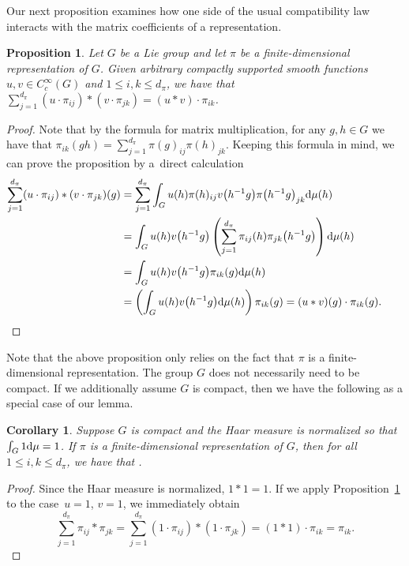 \documentclass[pdftex]{sigma}
\numberwithin{equation}{section}
\newtheorem{Corollary}[Theorem]{Corollary}
\newtheorem{Proposition}[Theorem]{Proposition}
\theoremstyle{definition}
\newcommand{\inv}{^{-1}}
\begin{document}
Our next proposition examines how one side of the usual compatibility law interacts with the matrix coefficients of a representation.
 \begin{Proposition}\label{proposition:convolution.of.non.irreducible.coefficients}
  Let $ G $ be a Lie group and let $ \pi $ be a finite-dimensional representation of $ G $. Given arbitrary compactly supported smooth functions $ u, v \in C_c^\infty(G) $ and
  $1 \le i, k \le d_\pi $,
  we have that
$\sum_{j=1}^{d_\pi} (u \cdot \pi_{ij}) * ( v \cdot \pi_{jk}) = (u * v) \cdot \pi_{ik}$.
\end{Proposition}
\begin{proof}
Note that by the formula for matrix multiplication, for any $ g,h \in G $ we have that
$\pi_{ik}(gh) = \sum_{j=1}^{d_\pi} \pi(g)_{ij} \pi(h)_{jk}$.
Keeping this formula in mind, we can prove the proposition by a~direct calculation
\begin{align*}
   \sum_{j=1}^{d_\pi} ( u \cdot \pi_{ij} ) * ( v \cdot \pi_{jk} ) (g) &= \sum_{j=1}^{d_\pi} \int_{G} u(h) \pi(h)_{ij} v\big(h\inv g\big) \pi\big(h\inv g\big)_{jk} {\rm d} \mu(h) \\
  &= \int_{G} u(h) v\big(h\inv g\big) \left( \sum_{j=1}^{d_\pi} \pi_{ij}(h) \pi_{jk}\big(h\inv g\big) \right) {\rm d} \mu(h) \\
   &= \int_G u(h) v\big(h\inv g\big) \pi_{ik}(g) {\rm d} \mu(h)  \\
   &= \left( \int_G u(h) v\big(h\inv g\big) {\rm d} \mu(h)\right) \pi_{ik}(g) = ( u * v)(g) \cdot \pi_{ik}(g).\tag*{\qed}
\end{align*}\renewcommand{\qed}{}
\end{proof}

Note that the above proposition only relies on the fact that $ \pi $ is a finite-dimensional representation. The group $ G $ does not necessarily need to be compact. If we additionally assume $ G $ is compact, then we have the following as a special case of our lemma.
\begin{Corollary}\label{corollary:conv.of.non.irred}
  Suppose $ G $ is compact and the Haar measure is normalized so that ${\int_G 1 {\rm d} \mu = 1}$. If $ \pi $ is a finite-dimensional representation of $ G $, then for all
  $1 \le i, k \le d_\pi$,
  we have that .
\end{Corollary}
\begin{proof}
   Since the Haar measure is normalized, $ 1 * 1 = 1 $. If we apply Proposition~\ref{proposition:convolution.of.non.irreducible.coefficients} to the case~${ u = 1}$, $v = 1 $, we immediately obtain
  \[ \sum_{j=1}^{d_\pi} \pi_{ij} * \pi_{jk} = \sum_{j=1}^{d_\pi} (1 \cdot \pi_{ij}) * (1 \cdot \pi_{jk}) = (1 * 1) \cdot \pi_{ik} = \pi_{ik}.\tag*{\qed}
   \]\renewcommand{\qed}{}
\end{proof}
\end{document}

